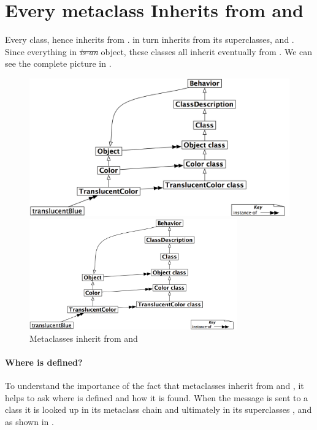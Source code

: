 \documentclass[a4paper,10pt,twoside]{book}
\begin{document}
\section{Every metaclass Inherits from  and }

Every   class, hence inherits from .
 in turn inherits from its superclasses,  and .
Since everything in \st \emph{is-an} object, these classes all inherit eventually from .
We can see the complete picture in .

\begin{center}
\begin{figure}
\ifluluelse
	{\centerline{\includegraphics[width=\textwidth]{TranslucentBehavior}}}
	{\centerline{\includegraphics[width=0.8\textwidth]{TranslucentBehavior}}}
\caption{Metaclasses inherit from  and \label{fig:inheritbehavior}}
\end{figure}
\end{center}

\paragraph{Where is  defined?}
To understand the importance of the fact that metaclasses inherit from  and , it helps to ask where  is defined and how it is found. When the message  is sent to a class it is looked up in its metaclass chain and ultimately in its superclasses ,  and  as shown in .
\end{document}
